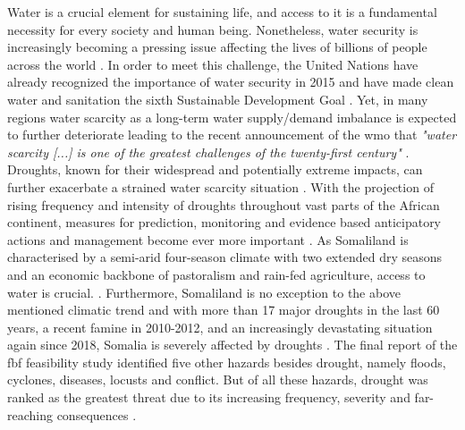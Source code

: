 Water is a crucial element for sustaining life, and access to it is a fundamental necessity for every society and human being. Nonetheless, water security is increasingly becoming a pressing issue affecting the lives of billions of people across the world \autocite{caretta2022water}. In order to meet this challenge, the United Nations have already recognized the importance of water security in 2015 and have made clean water and sanitation the sixth Sustainable Development Goal \autocite{unGoalEnsureAvailability2016}. Yet, in many regions water scarcity as a long-term water supply/demand imbalance is expected to further deteriorate leading to the recent announcement of the \acrlong*{wmo} that \textit{"water scarcity [...] is one of the greatest challenges of the twenty-first century"} \autocite[7]{idmpDroughtWaterScarcity2022}.\newline
Droughts, known for their widespread and potentially extreme impacts, can further exacerbate a strained water scarcity situation \autocite{idmpDroughtWaterScarcity2022}. With the projection of rising frequency and intensity of droughts throughout vast parts of the African continent, measures for prediction, monitoring and evidence based anticipatory actions and management become ever more important \autocite{abdulkadirAssessmentDroughtRecurrence2017,trisosAfrica2022,vereintenationenSpecialReportDrought2021}.\newline
As Somaliland is characterised by a semi-arid four-season climate with two extended dry seasons and an economic backbone of pastoralism and rain-fed agriculture, access to water is crucial. \autocite{abdulkadirAssessmentDroughtRecurrence2017,petrucciLandscapeLandformsNorthern2022,republicofsomalilandSomalilandCountryProfile2021}. Furthermore, Somaliland is no exception to the above mentioned climatic trend and with more than 17 major droughts in the last 60 years, a recent famine in 2010-2012, and an increasingly devastating situation again since 2018, Somalia is severely affected by droughts \autocite{abdulkadirAssessmentDroughtRecurrence2017,credEMDATInternationalDisasters2023}. The final report of the \acrshort{fbf} feasibility study identified five other hazards besides drought, namely floods, cyclones, diseases, locusts and conflict. But of all these hazards, drought was ranked as the greatest threat due to its increasing frequency, severity and far-reaching consequences \autocite{scrsFeasibilityStudyPotential2022}.\newline
